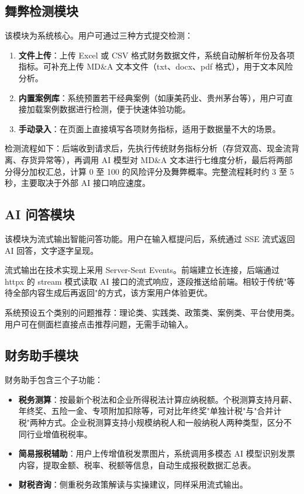 \documentclass[12pt,a4paper]{ctexart}
\begin{document}
\subsection{舞弊检测模块}

该模块为系统核心。用户可通过三种方式提交检测：

\begin{enumerate}
    \item \textbf{文件上传}：上传 Excel 或 CSV 格式财务数据文件，系统自动解析年份及各项指标。可补充上传 MD\&A 文本文件（txt、docx、pdf 格式），用于文本风险分析。
    \item \textbf{内置案例库}：系统预置若干经典案例（如康美药业、贵州茅台等），用户可直接加载案例数据进行检测，便于快速体验功能。
    \item \textbf{手动录入}：在页面上直接填写各项财务指标，适用于数据量不大的场景。
\end{enumerate}

检测流程如下：后端收到请求后，先执行传统财务指标分析（存贷双高、现金流背离、存货异常等），再调用 AI 模型对 MD\&A 文本进行七维度分析，最后将两部分得分加权汇总，计算 0 至 100 的风险评分及舞弊概率。完整流程耗时约 3 至 5 秒，主要取决于外部 AI 接口响应速度。

\subsection{AI 问答模块}

该模块为流式输出智能问答功能。用户在输入框提问后，系统通过 SSE 流式返回 AI 回答，文字逐字呈现。

流式输出在技术实现上采用 Server-Sent Events。前端建立长连接，后端通过 httpx 的 stream 模式读取 AI 接口的流式响应，逐段推送给前端。相较于传统"等待全部内容生成后再返回"的方式，该方案用户体验更优。

系统预设五个类别的问题推荐：理论类、实践类、政策类、案例类、平台使用类。用户可在侧面栏直接点击推荐问题，无需手动输入。

\subsection{财务助手模块}

财务助手包含三个子功能：

\begin{itemize}
    \item \textbf{税务测算}：按最新个税法和企业所得税法计算应纳税额。个税测算支持月薪、年终奖、五险一金、专项附加扣除等，可对比年终奖"单独计税"与"合并计税"两种方式。企业税测算支持小规模纳税人和一般纳税人两种类型，区分不同行业增值税税率。
    \item \textbf{简易报税辅助}：用户上传增值税发票图片，系统调用多模态 AI 模型识别发票内容，提取金额、税率、税额等信息，自动生成报税数据汇总表。
    \item \textbf{财税咨询}：侧重税务政策解读与实操建议，同样采用流式输出。
\end{itemize}
\end{document}

